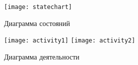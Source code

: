 \documentclass[a4paper,14pt]{extarticle}
\begin{document}
\newpage
{\centering
}

\label{sec:pril}

\begin{figure}[h!]
	\centering
	\texttt{[image: statechart]}
	\caption{Диаграмма состояний}
	\label{img:statechart}
\end{figure}

\begin{figure}[htbp]

	\texttt{[image: activity1]}
	\texttt{[image: activity2]}
	\caption{Диаграмма деятельности}
	\label{img:activity}
\end{figure}

	
\end{document}
